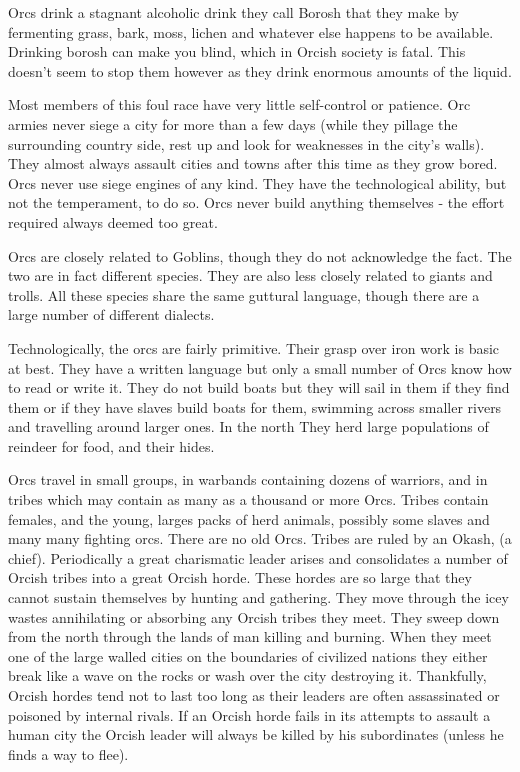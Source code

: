 \documentclass[a4paper]{dnd5}
\begin{document}
Orcs drink a stagnant alcoholic drink they call Borosh that they make by fermenting grass, bark, moss, lichen and whatever else happens to be available.  Drinking borosh can make you blind, which in Orcish society is fatal.  This doesn't seem to stop them however as they drink enormous amounts of the liquid.

Most members of this foul race have very little self-control or patience.  Orc armies never siege a city for more than a few days (while they pillage the surrounding country side, rest up and look for weaknesses in the city's walls).  They almost always assault cities and towns after this time as they grow bored.  Orcs never use siege engines of any kind.  They have the technological ability, but not the temperament, to do so.  Orcs never build anything themselves - the effort required always deemed too great.

Orcs are closely related to Goblins, though they do not acknowledge the fact.  The two are in fact different species.  They are also less closely related to giants and trolls.  All these species share the same guttural language, though there are a large number of different dialects.

Technologically, the orcs are fairly primitive.  Their grasp over iron work is basic at best.  They have a written language but only a small number of Orcs know how to read or write it.  They do not build boats but they will sail in them if they find them or if they have slaves build boats for them, swimming across smaller rivers and travelling around larger ones.  In the north They herd large populations of reindeer for food, and their hides.

Orcs travel in small groups, in warbands containing dozens of warriors, and in tribes which may contain as many as a thousand or more Orcs.  Tribes contain females, and the young, larges packs of herd animals, possibly some slaves and many many fighting orcs.  There are no old Orcs.  Tribes are ruled by an Okash, (a chief).  Periodically a great charismatic leader arises and consolidates a number of Orcish tribes into a great Orcish horde.  These hordes are so large that they cannot sustain themselves by hunting and gathering.  They move through the icey wastes annihilating or absorbing any Orcish tribes they meet.  They sweep down from the north through the lands of man killing and burning.  When they meet one of the large walled cities on the boundaries of civilized nations they either break like a wave on the rocks or wash over the city destroying it.   Thankfully, Orcish hordes tend not to last too long as their leaders are often assassinated or poisoned by internal rivals.  If an Orcish horde fails in its attempts to assault a human city the Orcish leader will always be killed by his subordinates (unless he finds a way to flee).
\end{document}
